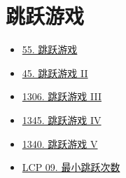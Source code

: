 \newpage
\section{跳跃游戏}

\begin{itemize}
  \item \hyperref[leetcode:55]{55. 跳跃游戏}
  \item \hyperref[leetcode:45]{45. 跳跃游戏 II}
  \item \hyperref[leetcode:1306]{1306. 跳跃游戏 III}
  \item \hyperref[leetcode:1345]{1345. 跳跃游戏 IV}
  \item \hyperref[leetcode:1340]{1340. 跳跃游戏 V}
  \item \hyperref[leetcode:lcp_09]{LCP 09. 最小跳跃次数}
\end{itemize}
